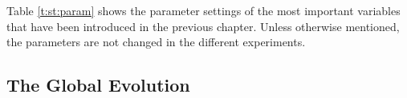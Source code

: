 Table \ref{t:st:param} shows the parameter settings of the most important variables that have been introduced in the previous chapter. Unless otherwise mentioned, the parameters are not changed in the different experiments.

\subsection{The Global Evolution}

\begin{figure}
\centering
{}
\\
\\

\end{figure}
